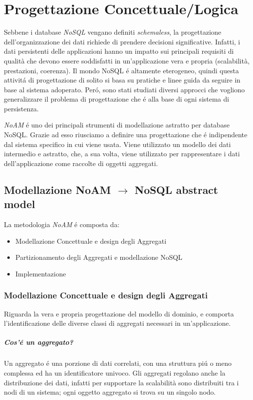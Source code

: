 \chapter{Progettazione Concettuale/Logica}
Sebbene i database \emph{NoSQL} vengano definiti \emph{schemaless}, la progettazione dell'organizzazione dei dati richiede
di prendere decisioni significative. Infatti, i dati persistenti delle applicazioni hanno un impatto sui principali requisiti
di qualità che devono essere soddisfatti in un'applicazione vera e propria (scalabilità, prestazioni, coerenza).
Il mondo NoSQL é altamente eterogeneo, quindi questa attivitá di progettazione di solito si basa su pratiche e linee guida da seguire
in base al sistema adoperato. Peró, sono stati studiati diversi approcci che vogliono generalizzare il problema di progettazione
che é alla base di ogni sistema di persistenza.

\emph{NoAM} é uno dei principali strumenti di modellazione astratto per database NoSQL. Grazie ad esso riusciamo a definire
una progettazione che é indipendente dal sistema specifico in cui viene usata. Viene utilizzato un modello dei dati intermedio e astratto,
che, a sua volta, viene utilizzato per rappresentare i dati dell'applicazione come raccolte di oggetti aggregati.
\section{Modellazione NoAM $\to$ NoSQL abstract model}
La metodologia \emph{NoAM} é composta da:
\begin{itemize}
    \item Modellazione Concettuale e design degli Aggregati
    \item Partizionamento degli Aggregati e modellazione NoSQL
    \item Implementazione
\end{itemize}

\subsection{Modellazione Concettuale e design degli Aggregati}
Riguarda la vera e propria progettazione del modello di dominio, e comporta l'identificazione
delle diverse classi di aggregati necessari in un'applicazione.

\paragraph{Cos'é un aggregato?}
Un aggregato é una porzione di dati correlati, con una struttura piú o meno complessa ed ha un identificatore univoco.
Gli aggregati regolano anche la distribuzione dei dati, infatti per supportare la scalabilità sono distribuiti tra i nodi
di un sistema;
ogni oggetto aggregato si trova su un singolo nodo.\\

